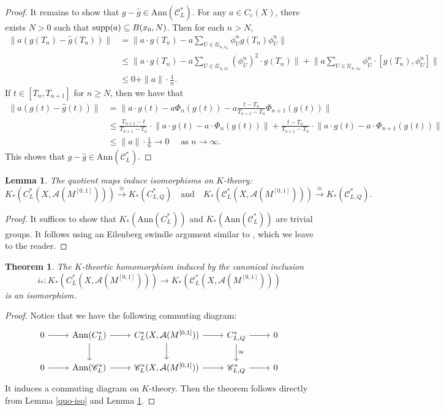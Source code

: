 \documentclass[11pt]{article}
\theoremstyle{definition}
\theoremstyle{plain}
\newtheorem{Thm}[Def]{Theorem}
\newtheorem{Lem}[Def]{Lemma}
\def\A{\mathcal A}\def\C{\mathcal C}\def\B{\mathcal B}\def\E{\mathcal E}\def\O{\mathcal O}\def\h{\mathfrak h}\def\K{\mathcal K}\def\F{\mathcal F}\def\P{\mathcal P}\def\L{\mathcal L}\def\R{\mathcal R}\def\Q{\mathcal Q}\def\H{\mathcal H}\def\S{\mathcal S}\def\N{\mathcal N}\def\U{\mathcal U}\def\V{\mathcal V}
\def\sC{\mathscr C}
\def\supp{\textup{supp}}
\def\wh{\widehat}
\begin{document}
\begin{appendices}
\begin{proof}
It remains to show that $g-\wh g\in \mathrm{Ann}(\sC^*_L)$. For any $a\in C_c(X)$, there exists $N>0$ such that $\supp(a)\subseteq B(x_0,N)$. Then for each $n>N$,
\[\begin{split}
\|a(g(T_n)-\wh g(T_n))\|&=\Big\|a\cdot g(T_n)-a\sum_{U\in\U_{n,x_0}}\phi^n_U g(T_n)\phi^n_U\Big\|\\
&\leq \Big\|a\cdot g(T_n)-a\sum_{U\in\U_{n,x_0}}(\phi^n_U)^2\cdot g(T_n)\Big\|+\Big\|a\sum_{U\in\U_{n,x_0}}\phi^n_U\cdot[g(T_n),\phi^n_U]\Big\|\\
&\leq 0+\|a\|\cdot\frac 1n.
\end{split}\]
If $t\in[T_n,T_{n+1}]$ for $n\geq N$, then we have that
\[\begin{split}
\|a(g(t)-\wh g(t))\|&= \Big\|a\cdot g(t)-a\Phi_n(g(t))-a\frac{t-T_n}{T_{n+1}-T_n}\Phi_{n+1}(g(t))\Big\|\\
&\leq \frac{T_{n+1}-t}{T_{n+1}-T_n}\cdot\Big\|a\cdot g(t)-a\cdot\Phi_n(g(t))\Big\|+\frac{t-T_n}{T_{n+1}-T_n}\cdot\Big\|a\cdot g(t)-a\cdot\Phi_{n+1}(g(t))\Big\|\\
&\leq \|a\|\cdot\frac 1n\to 0\quad\text{ as }n\to\infty.
\end{split}\]
This shows that $g-\wh g\in \mathrm{Ann}(\sC^*_L)$.
\end{proof}

\begin{Lem}\label{ann-zero}
The quotient maps induce isomorphisms on $K$-theory:
$$K_*(C^*_L(X,\A(M^{[0,1]})))\xrightarrow{\cong} K_*(C^*_{L,Q})\quad \text{and}\quad K_*(\sC^*_L(X,\A(M^{[0,1]})))\xrightarrow{\cong}K_*(\sC^*_{L,Q}).$$
\end{Lem}

\begin{proof}
It suffices to show that $K_*(\mathrm{Ann}(C^*_L))$ and $K_*(\mathrm{Ann}(\sC^*_L))$ are trivial groups. It follows using an Eilenberg swindle argument similar to \cite[Lemma 6.4.11]{HIT2020}, which we leave to the reader.
\end{proof}

\begin{Thm}\label{comm-prop}
The $K$-theortic homomorphism induced by the canonical inclusion
$$i_*:K_*(C^*_L(X,\A(M^{[0,1]})))\to K_*(\sC^*_L(X,\A(M^{[0,1]})))$$
is an isomorphism.
\end{Thm}

\begin{proof}
Notice that we have the following commuting diagram:
$$\begin{tikzcd}
0 \arrow[r] & \mathrm{Ann}(C^*_L) \arrow[r] \arrow[d] & C^*_L(X,\A(M^{[0,1]})) \arrow[r] \arrow[d] & C^*_{L,Q} \arrow[d, "\cong"] \arrow[r] & 0 \\
0 \arrow[r] & \mathrm{Ann}(\sC^*_L) \arrow[r]           & \sC^*_L(X,\A(M^{[0,1]})) \arrow[r]           & \sC^*_{L,Q} \arrow[r]           & 0
\end{tikzcd}$$
It induces a commuting diagram on $K$-theory. Then the theorem follows directly from Lemma \ref{quo-iso} and Lemma \ref{ann-zero}.
\end{proof}


\end{appendices}
\end{document}
